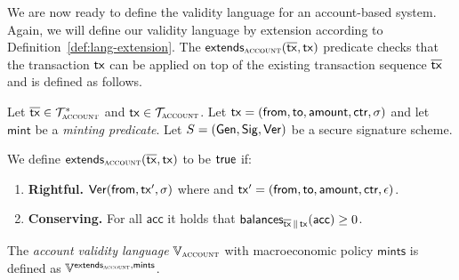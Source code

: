 We are now ready to define the validity language for an account-based system.
Again, we will
define our validity language by extension according to
Definition~\ref{def:lang-extension}.
The $\textsf{extends}_{\textsc{account}}(\overline{\mathsf{tx}}, \mathsf{tx})$ predicate checks that
the transaction $\mathsf{tx}$ can be applied on top of the existing transaction sequence
$\overline{\mathsf{tx}}$ and is defined as follows.

\begin{definition}
  Let $\overline{\mathsf{tx}} \in \mathcal{T}_\textsc{account}^*$ and $\mathsf{tx} \in \mathcal{T}_{\textsc{account}}$.
  Let $\mathsf{tx} = (\textsf{from}, \textsf{to}, \textsf{amount}, \textsf{ctr}, \sigma)$
  and let $\textsf{mint}$ be a \emph{minting predicate}.
  Let $S = (\mathsf{Gen}, \mathsf{Sig}, \mathsf{Ver})$ be a secure signature scheme.

  We define $\textsf{extends}_{\textsc{account}}(\overline{\mathsf{tx}}, \mathsf{tx})$ to be $\textsf{true}$
  if:

  \begin{enumerate}
    \item \textbf{Rightful.}
          $\mathsf{Ver}(\textsf{from}, \mathsf{tx}', \sigma)$ where
          and $\mathsf{tx}' = (\textsf{from}, \textsf{to}, \textsf{amount}, \textsf{ctr}, \epsilon)$.
    \item \textbf{Conserving.}
          For all $\textsf{acc}$ it holds that
          $\textsf{balances}_{\overline{\mathsf{tx}} \,\|\, \mathsf{tx}}(\textsf{acc}) \geq 0$.
  \end{enumerate}

  The \emph{account validity language} $\mathbb{V}_{\textsc{account}}$ with macroeconomic
  policy $\textsf{mints}$ is defined as
  $\mathbb{V}^{\textsf{extends}_{\textsc{account}},\textsf{mints}}$.
\end{definition}
